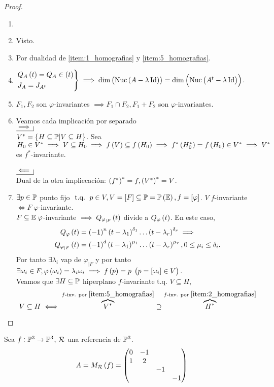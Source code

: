\begin{proof}
	\begin{enumerate}[(1)]
		\item[]
		\item Visto.
		\item Por dualidad de \eqref{item:1_homografias} y \eqref{item:5_homografias}.
		\item $\begin{rcases}
			Q_A\left( t\right) = Q_A\in\left( t\right)\\
			J_A = J_{A^t}
		\end{rcases}
		\implies \dim\left(\text{Nuc}\left( A-\lambda\operatorname{Id}\right)\right)=\dim\left(\text{Nuc}\left( A^t - \lambda\operatorname{Id}\right)\right)$.
		\item $F_1, F_2$ son $\varphi$-invariantes $\implies F_1 \cap F_2, F_1 + F_2$ son $\varphi$-invariantes.
		\item Veamos cada implicación por separado \\
		$\bimplies$ \\
		$V^* = \{ H\subseteq\mathbb{P} | V \subseteq H\}$. Sea $H_0\in V^* \implies V \subseteq H_0 \implies f\left( V\right)\subseteq f\left( H_0\right)\implies f^*\left( H_0^*\right) = f\left( H_0\right) \in V^*\implies V^*$ es $f^*$-invariante. \\ \\
		$\bimpliedby$ \\
		Dual de la otra impliecación: $\left( f^*\right)^* = f, \left( V^*\right)^*= V$.
		\item $\exists p\in\mathbb{P}$ punto fijo $\operatorname{\text{ t.q. }} p \in V, V = [F] \subseteq\mathbb{P} = \mathbb{P}\left(\mathbb{E}\right), f=[\varphi]$. $V \; f$-invariante $\iff F\; \varphi$-invariante. \\
		$F \subseteq \mathbb{E}\; \varphi$-invariante $\implies Q_{\varphi_{|F}}\left( t\right)$ divide a $Q_\varphi\left( t \right)$. En este caso,
		\begin{align*}
			Q_\varphi\left( t\right) &= \left(-1\right)^n\left( t-\lambda_1\right)^{\delta_1} \dots \left( t-\lambda_r\right)^{\delta_r} \implies \\
			Q_{\varphi_{|F}}\left( t\right) &= \left(-1\right)^d\left( t-\lambda_1\right)^{\mu_1}\dots\left( t-\lambda_r\right)^{\mu_r}, 0\leq\mu_i\leq\delta_i.
		\end{align*}
		Por tanto $\exists \lambda_i$ vap de $\varphi_{|F}$ y por tanto $\exists \omega_i\in F, \varphi\left(\omega_i\right)=\lambda_i\omega_i \implies f\left( p\right)=p\;\left( p = [\omega_i]\in V\right).$ \\
		Veamos que $\exists H\subseteq \mathbb{P}$ hiperplano $f$-invariante t.q. $V\subseteq H$,
		\[
			V \subseteq H \iff \overbrace{V^*}^{f\text{-inv. por }\eqref{item:5_homografias}} \supseteq \overbrace{H^*}^{f\text{-inv. por }\eqref{item:2_homografias}}
		\]
	\end{enumerate}
\end{proof}
\begin{example}
	Sea $f : \mathbb{P}^3 \to \mathbb{P}^3$, $\mathcal{R}$ una referencia de $\mathbb{P}^3$.
	\[
		A = M_{\mathcal{R}}\left( f\right) = \begin{pmatrix}
			0 & -1 & & \\
			1 & 2 & & \\
			& & -1 & \\
			& & & -1
		\end{pmatrix}
	\]
\end{example}

